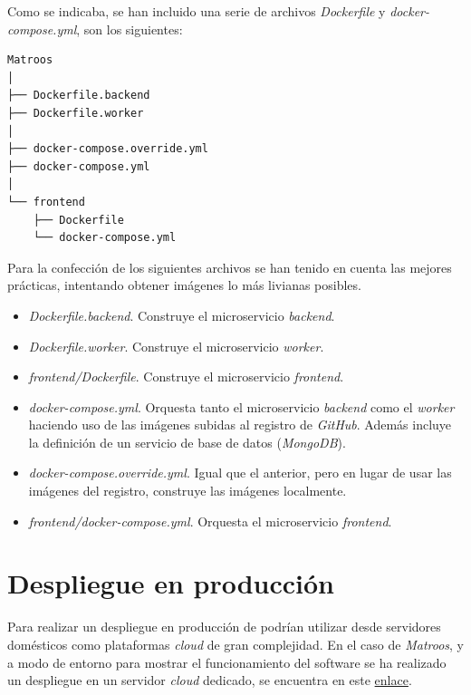 Como se indicaba, se han incluido una serie de archivos \textit{Dockerfile} y \textit{docker-compose.yml}, son los siguientes:

\begin{lstlisting}[style=tree]
Matroos
│
├── Dockerfile.backend
├── Dockerfile.worker
│
├── docker-compose.override.yml
├── docker-compose.yml
│
└── frontend
    ├── Dockerfile
    └── docker-compose.yml
\end{lstlisting}

Para la confección de los siguientes archivos se han tenido en cuenta las mejores prácticas, intentando obtener imágenes lo más livianas posibles.

\begin{itemize}
	\item \textit{Dockerfile.backend}. Construye el microservicio \textit{backend}.
	\item \textit{Dockerfile.worker}. Construye el microservicio \textit{worker}.
	\item \textit{frontend/Dockerfile}. Construye el microservicio \textit{frontend}.
\end{itemize}

\begin{itemize}
	\item \textit{docker-compose.yml}. Orquesta tanto el microservicio \textit{backend} como el \textit{worker} haciendo uso de las imágenes subidas al registro de \textit{GitHub}. Además incluye la definición de un servicio de base de datos (\textit{MongoDB}).
	\item \textit{docker-compose.override.yml}. Igual que el anterior, pero en lugar de usar las imágenes del registro, construye las imágenes localmente.
	\item \textit{frontend/docker-compose.yml}. Orquesta el microservicio \textit{frontend}.
\end{itemize}


\section{Despliegue en producción}

Para realizar un despliegue en producción de podrían utilizar desde servidores domésticos como plataformas \textit{cloud} de gran complejidad. En el caso de \textit{Matroos}, y a modo de entorno para mostrar el funcionamiento del software se ha realizado un despliegue en un servidor \textit{cloud} dedicado, se encuentra en este \href{https://0xhc.com:9000/}{enlace}.

